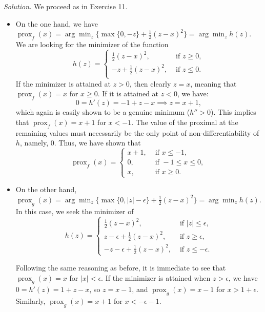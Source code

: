 \documentclass[12pt]{article}
\begin{document}
\emph{Solution.} We proceed as in Exercise 11.
\begin{itemize}
    \item On the one hand, we have \( \operatorname{prox}_f(x) = \arg\min_z\{\max\{0, -z\} + \frac{1}{2} (z - x)^2 \} = \arg\min_z h(z) \). We are looking for the minimizer of the function
        \[
             h(z) = \begin{cases}
                 \frac{1}{2} (z - x)^2, &\text{ if } z \geq 0,\\
                -z + \frac{1}{2} (z - x)^2, &\text{ if } z \leq 0.\\
             \end{cases}
        \]
        If the minimizer is attained at $z> 0$, then clearly $z=x$, meaning that $\operatorname{prox}_f(x)=x$ for $x\geq 0$. If it is attained at $z<0$, we have:
        \[
        0=h'(z)= -1 + z - x \implies z = x+1,
        \]
        which again is easily shown to be a genuine minimum ($h''>0$). This implies that $\operatorname{prox}_f(x)=x+1$ for $x< -1$. The value of the proximal at the remaining values must necessarily be the only point of non-differentiability of $h$, namely, $0$. Thus, we have shown that
        \[
             \operatorname{prox}_f(x)= \begin{cases}
             x+1, & \text{ if } x\leq -1,\\
               0, & \text{ if } -1 \leq x \leq 0,\\
              x, & \text{ if } x \geq 0.
           \end{cases}
        \]
    \item On the other hand, \( \operatorname{prox}_g(x) = \arg\min_z\{\max\{0, |z| -\epsilon\} + \frac{1}{2} (z - x)^2 \} = \arg\min_z h(z) \). In this case, we seek the minimizer of
        \[
             h(z)= \begin{cases}
                \frac{1}{2} (z - x)^2, &\text{ if } |z| \leq \epsilon,\\
                z - \epsilon + \frac{1}{2} (z - x)^2, &\text{ if }   z \geq \epsilon,\\
                -z - \epsilon + \frac{1}{2} (z - x)^2, &\text{ if }   z \leq -\epsilon.
             \end{cases}
        \]

Following the same reasoning as before, it is immediate to see that $\operatorname{prox}_g(x)=x$ for $|x|<\epsilon$. If the minimizer is attained when $z>\epsilon$, we have $0=h'(z)=1+z-x$, so $z=x-1$, and $\operatorname{prox}_g(x)=x-1$ for $x>1+\epsilon$. Similarly, $\operatorname{prox}_g(x)=x+1$ for $x< -\epsilon-1$.


\end{itemize}
\end{document}
